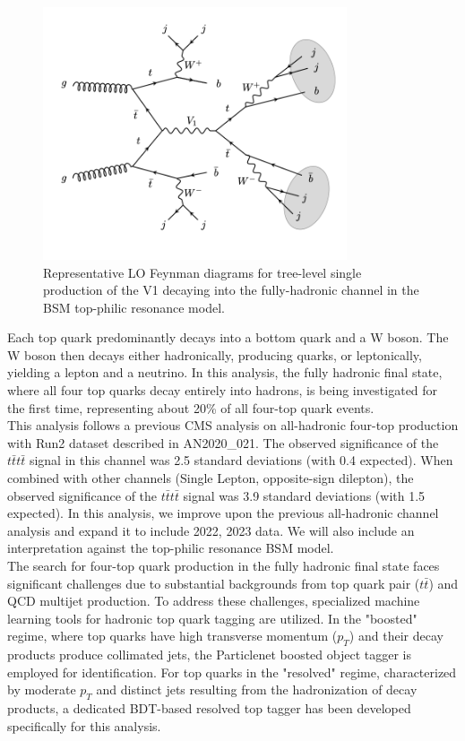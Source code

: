 \documentclass[twoside]{article}
\begin{document}
\begin{figure}[h!]
    \centering
    \includegraphics[width=0.8\textwidth]{plots/tp_feymann.png}
    \caption{Representative LO Feynman diagrams for tree-level single production of the V1 decaying into the fully-hadronic channel in the BSM top-philic resonance model.}
    \label{fig:tp_feymann}
\end{figure}

Each top quark predominantly decays into a bottom quark and a W boson. The W boson then decays either hadronically, producing quarks, or leptonically, yielding a lepton and a neutrino. In this analysis, the fully hadronic final state, where all four top quarks decay entirely into hadrons, is being investigated for the first time, representing about 20\% of all four-top quark events.\\

This analysis follows a previous CMS analysis on all-hadronic four-top production with Run2 dataset described in AN2020\_021. The observed significance of the \(t\bar{t}t\bar{t}\) signal in this channel was 2.5 standard deviations (with 0.4 expected). When combined \cite{prev_ftop_analysis} with other channels (Single Lepton, opposite-sign dilepton), the observed significance of the \(t\bar{t}t\bar{t}\) signal was 3.9 standard deviations (with 1.5 expected). In this analysis, we improve upon the previous all-hadronic channel analysis and expand it to include 2022, 2023 data. We will also include an interpretation against the top-philic resonance BSM model\cite{topphilic}.\\

The search for four-top quark production in the fully hadronic final state faces significant challenges due to substantial backgrounds from top quark pair (\(t\bar{t}\)) and QCD multijet production. To address these challenges, specialized machine learning tools for hadronic top quark tagging are utilized. In the "boosted" regime, where top quarks have high transverse momentum (\(p_T\)) and their decay products produce collimated jets, the Particlenet boosted object tagger is employed for identification. For top quarks in the "resolved" regime, characterized by moderate \(p_T\) and distinct jets resulting from the hadronization of decay products, a dedicated BDT-based resolved top tagger has been developed specifically for this analysis.
\end{document}
